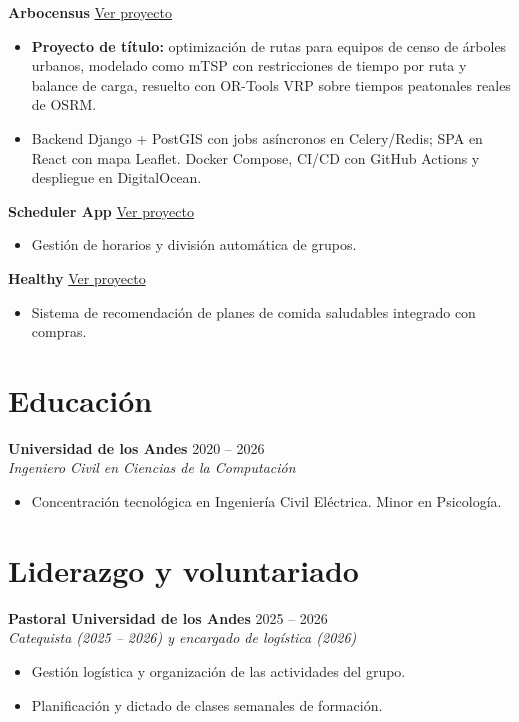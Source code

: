 \documentclass[a4paper,11pt]{article}
\newcommand{\entry}[3]{%
  {\large\textbf{#1}} \hfill {\color{muted}#2} \\
  {\color{accent}\textit{#3}}\par
}
\newcommand{\entrygap}{\vspace{5pt}}
\begin{document}
{\large\textbf{Arbocensus}}  \hfill \href{https://albertozuiga.github.io/projects/arbocensus}{Ver proyecto}
\begin{itemize}
  \item \textbf{Proyecto de título:} optimización de rutas para equipos de censo de árboles urbanos, modelado como mTSP
        con restricciones de tiempo por ruta y balance de carga, resuelto con OR-Tools VRP sobre tiempos peatonales reales de OSRM.
  \item Backend Django + PostGIS con jobs asíncronos en Celery/Redis; SPA en React con mapa Leaflet.
        Docker Compose, CI/CD con GitHub Actions y despliegue en DigitalOcean.
\end{itemize}
\entrygap

{\large\textbf{Scheduler App}}  \hfill \href{https://albertozuiga.github.io/projects/scheduler}{Ver proyecto}
\begin{itemize}
  \item Gestión de horarios y división automática de grupos.
\end{itemize}
\entrygap

{\large\textbf{Healthy}}  \hfill \href{https://albertozuiga.github.io/projects/healthy}{Ver proyecto}
\begin{itemize}
  \item Sistema de recomendación de planes de comida saludables integrado con compras.
\end{itemize}

\section*{Educación}

\entry{Universidad de los Andes}{2020 -- 2026}{Ingeniero Civil en Ciencias de la Computación}
\begin{itemize}
  \item Concentración tecnológica en Ingeniería Civil Eléctrica. Minor en Psicología.
\end{itemize}

\section*{Liderazgo y voluntariado}

\entry{Pastoral Universidad de los Andes}{2025 -- 2026}{Catequista (2025 -- 2026) y encargado de logística (2026)}
\begin{itemize}
  \item Gestión logística y organización de las actividades del grupo.
  \item Planificación y dictado de clases semanales de formación.
\end{itemize}
\entrygap
\end{document}
